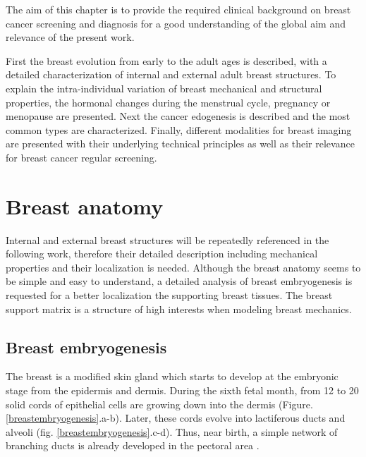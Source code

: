 

The aim of this chapter is to provide the required clinical background on breast cancer screening and diagnosis for a good understanding of the global aim and relevance of the present work. 

First the breast evolution from early to the adult ages is described, with a detailed characterization of internal and external adult breast structures. To explain the intra-individual variation of breast mechanical and structural properties, the hormonal changes during the menstrual cycle, pregnancy or menopause are presented.   Next the cancer edogenesis is described and the most common types are characterized. Finally, different modalities for breast imaging are presented with their underlying technical principles as well as their relevance for breast cancer regular screening.

\clearpage
\section{Breast anatomy}\label{section:breastanatomy}

Internal and external breast structures will be repeatedly referenced in the following work, therefore their detailed description including mechanical properties and their localization is needed. Although the breast anatomy seems to be simple and easy to understand, a detailed analysis of breast embryogenesis is requested for a better localization the supporting breast tissues. The breast support matrix is a structure of high interests when modeling breast mechanics.  

  
\subsection{Breast embryogenesis}\label{subsection:breastembryogenesis}

The breast is a modified skin gland which starts to develop at the embryonic stage from the epidermis and dermis.  During the sixth fetal month, from 12 to 20 solid cords of epithelial cells are growing down into the dermis (Figure. \ref{breastembryogenesis}.a-b). Later, these cords evolve into lactiferous ducts and alveoli (fig. \ref{breastembryogenesis}.c-d). Thus, near birth, a simple network of branching ducts is already developed in the pectoral area \citep{skandalakis_embryology_2009}.
 

